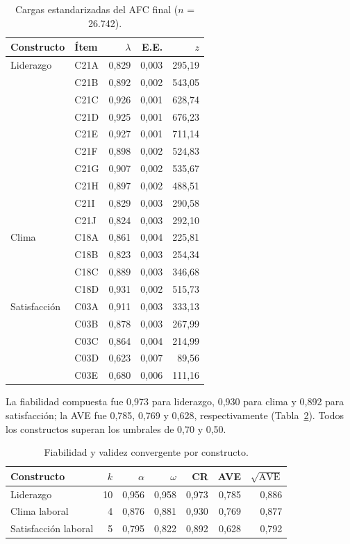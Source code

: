 \documentclass[11pt,a4paper]{article}
\begin{document}
\begin{table}[htbp]
\centering
\caption{Cargas estandarizadas del AFC final ($n$ = 26.742).}
\label{tab:cargas}
\small
\begin{tabular}{@{}llrrr@{}}
\toprule
Constructo & Ítem & $\lambda$ & E.E. & $z$ \\
\midrule
Liderazgo & C21A & 0,829 & 0,003 & 295,19 \\
          & C21B & 0,892 & 0,002 & 543,05 \\
          & C21C & 0,926 & 0,001 & 628,74 \\
          & C21D & 0,925 & 0,001 & 676,23 \\
          & C21E & 0,927 & 0,001 & 711,14 \\
          & C21F & 0,898 & 0,002 & 524,83 \\
          & C21G & 0,907 & 0,002 & 535,67 \\
          & C21H & 0,897 & 0,002 & 488,51 \\
          & C21I & 0,829 & 0,003 & 290,58 \\
          & C21J & 0,824 & 0,003 & 292,10 \\
Clima     & C18A & 0,861 & 0,004 & 225,81 \\
          & C18B & 0,823 & 0,003 & 254,34 \\
          & C18C & 0,889 & 0,003 & 346,68 \\
          & C18D & 0,931 & 0,002 & 515,73 \\
Satisfacción & C03A & 0,911 & 0,003 & 333,13 \\
          & C03B & 0,878 & 0,003 & 267,99 \\
          & C03C & 0,864 & 0,004 & 214,99 \\
          & C03D & 0,623 & 0,007 & 89,56 \\
          & C03E & 0,680 & 0,006 & 111,16 \\
\bottomrule
\end{tabular}
\end{table}

La fiabilidad compuesta fue 0,973 para liderazgo, 0,930 para clima y 0,892 para satisfacción;
la AVE fue 0,785, 0,769 y 0,628, respectivamente (Tabla~\ref{tab:fiabilidad}). Todos los
constructos superan los umbrales de 0,70 y 0,50.

\begin{table}[htbp]
\centering
\caption{Fiabilidad y validez convergente por constructo.}
\label{tab:fiabilidad}
\small
\begin{tabular}{@{}lrrrrrr@{}}
\toprule
Constructo & $k$ & $\alpha$ & $\omega$ & CR & AVE & $\sqrt{\mathrm{AVE}}$ \\
\midrule
Liderazgo & 10 & 0,956 & 0,958 & 0,973 & 0,785 & 0,886 \\
Clima laboral & 4 & 0,876 & 0,881 & 0,930 & 0,769 & 0,877 \\
Satisfacción laboral & 5 & 0,795 & 0,822 & 0,892 & 0,628 & 0,792 \\
\bottomrule
\end{tabular}
\end{table}
\end{document}
